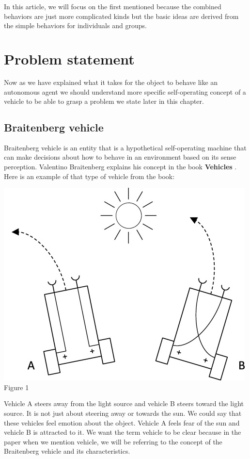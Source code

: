 \documentclass[10pt,twoside,english,a4paper]{article}
\begin{document}
In this article, we will focus on the first mentioned because 
the combined behaviors are just more complicated kinds but 
the basic ideas are derived from the simple behaviors for 
individuals and groups. 

\section{Problem statement} \label{problem}

Now as we have explained what it takes for the object to behave like 
an autonomous agent we should understand more specific self-operating
concept of a vehicle to be able to grasp a problem we state later 
in this chapter.

\subsection{Braitenberg vehicle} \label{braitenberg}

Braitenberg vehicle is an entity that is a hypothetical self-operating
machine that can make decisions about how to behave in an environment
based on its sense perception. Valentino Braitenberg explains his 
concept in the book \textbf{Vehicles} \cite{Braitenberg}. Here is 
an example of that type of vehicle from the book:

\bigbreak

\includegraphics[scale=0.33]{braitenberg.jpg}
\quad Figure 1
\bigbreak

Vehicle A steers away from the light source and vehicle B steers 
toward the light source. It is not just about steering away or 
towards the sun. We could say that these vehicles feel emotion about 
the object. Vehicle A feels fear of the sun and vehicle B is 
attracted to it. We want the term vehicle to be clear because in 
the paper when we mention vehicle, we will be referring to the 
concept of the Braitenberg vehicle and its characteristics. 
\end{document}
